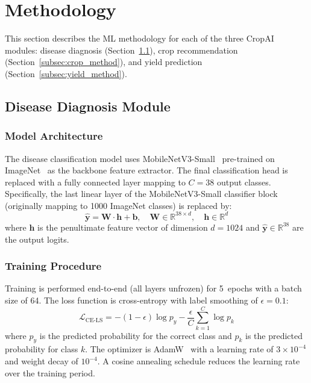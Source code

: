 \documentclass[conference]{IEEEtran}
\begin{document}
\section{Methodology}
\label{sec:methodology}

This section describes the ML methodology for each of the three CropAI modules: disease diagnosis (Section~\ref{subsec:disease_method}), crop recommendation (Section~\ref{subsec:crop_method}), and yield prediction (Section~\ref{subsec:yield_method}).

\subsection{Disease Diagnosis Module}
\label{subsec:disease_method}

\subsubsection{Model Architecture}
The disease classification model uses MobileNetV3-Small~\cite{howard2019searching} pre-trained on ImageNet~\cite{deng2009imagenet} as the backbone feature extractor. The final classification head is replaced with a fully connected layer mapping to $C = 38$ output classes. Specifically, the last linear layer of the MobileNetV3-Small classifier block (originally mapping to 1000 ImageNet classes) is replaced by:
\begin{equation}
  \hat{\mathbf{y}} = \mathbf{W} \cdot \mathbf{h} + \mathbf{b}, \quad \mathbf{W} \in \mathbb{R}^{38 \times d}, \quad \mathbf{h} \in \mathbb{R}^{d}
\end{equation}
where $\mathbf{h}$ is the penultimate feature vector of dimension $d = 1024$ and $\hat{\mathbf{y}} \in \mathbb{R}^{38}$ are the output logits.

\subsubsection{Training Procedure}
Training is performed end-to-end (all layers unfrozen) for 5~epochs with a batch size of 64. The loss function is cross-entropy with label smoothing of $\epsilon = 0.1$:
\begin{equation}
  \mathcal{L}_{\text{CE-LS}} = -(1 - \epsilon) \log p_{y} - \frac{\epsilon}{C} \sum_{k=1}^{C} \log p_{k}
\end{equation}
where $p_{y}$ is the predicted probability for the correct class and $p_{k}$ is the predicted probability for class $k$. The optimizer is AdamW~\cite{loshchilov2019decoupled} with a learning rate of $3 \times 10^{-4}$ and weight decay of $10^{-4}$. A cosine annealing schedule reduces the learning rate over the training period.
\end{document}
